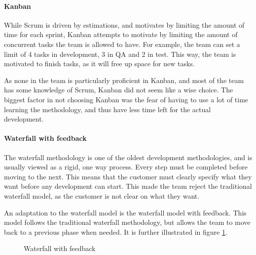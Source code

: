 \documentclass[11pt,a4paper,titlepage,oneside]{report}
\begin{document}
\paragraph{Kanban}
While Scrum is driven by estimations, and motivates by limiting the amount of time for each sprint, Kanban attempts to motivate by limiting the amount of concurrent tasks the team is allowed to have. For example, the team can set a limit of 4 tasks in development, 3 in \gls{QA} and 2 in test. This way, the team is motivated to finish tasks, as it will free up space for new tasks. 

As none in the team is particularly proficient in Kanban, and most of the team has some knowledge of Scrum, Kanban did not seem like a wise choice. The biggest factor in not choosing Kanban was the fear of having to use a lot of time learning the methodology, and thus have less time left for the actual development. 

\paragraph{Waterfall with feedback}
The waterfall methodology is one of the oldest development methodologies, and is usually viewed as a rigid, one way process. Every step must be completed before moving to the next. This means that the customer must clearly specify what they want before any development can start. This made the team reject the traditional waterfall model, as the customer is not clear on what they want.

An adaptation to the waterfall model is the waterfall model with feedback. This model follows the traditional waterfall methodology, but allows the team to move back to a previous phase when needed. It is further illustrated in figure \ref{fig:WaterfallFeedback}.

\begin{figure}[h]
\begin{center}
\caption{Waterfall with feedback} \cite{waterfall:feedback}
\label{fig:WaterfallFeedback}
\end{center}
\end{figure}
\end{document}
